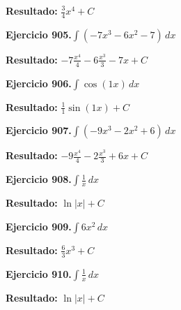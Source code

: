 \documentclass[10pt,a4paper]{article}
\begin{document}
\begin{solbox}
\textbf{Resultado:} \(\displaystyle \frac{3}{4}x^{4} + C\)
\end{solbox}

\begin{ejbox}
\textbf{Ejercicio 905.}\quad $\int (-7x^3 -6x^2 -7)\,dx$
\end{ejbox}

\begin{solbox}
\textbf{Resultado:} \(\displaystyle -7\frac{x^4}{4} -6\frac{x^3}{3} -7x + C\)
\end{solbox}

\begin{ejbox}
\textbf{Ejercicio 906.}\quad $\int \cos(1x)\,dx$
\end{ejbox}

\begin{solbox}
\textbf{Resultado:} \(\displaystyle \frac{1}{1}\sin(1x) + C\)
\end{solbox}

\newpage
\begin{ejbox}
\textbf{Ejercicio 907.}\quad $\int (-9x^3 -2x^2 +6)\,dx$
\end{ejbox}

\begin{solbox}
\textbf{Resultado:} \(\displaystyle -9\frac{x^4}{4} -2\frac{x^3}{3} +6x + C\)
\end{solbox}

\begin{ejbox}
\textbf{Ejercicio 908.}\quad $\int \frac{1}{x}\,dx$
\end{ejbox}

\begin{solbox}
\textbf{Resultado:} \(\displaystyle \ln|x| + C\)
\end{solbox}

\begin{ejbox}
\textbf{Ejercicio 909.}\quad $\int 6x^{2}\,dx$
\end{ejbox}

\begin{solbox}
\textbf{Resultado:} \(\displaystyle \frac{6}{3}x^{3} + C\)
\end{solbox}

\newpage
\begin{ejbox}
\textbf{Ejercicio 910.}\quad $\int \frac{1}{x}\,dx$
\end{ejbox}

\begin{solbox}
\textbf{Resultado:} \(\displaystyle \ln|x| + C\)
\end{solbox}
\end{document}

